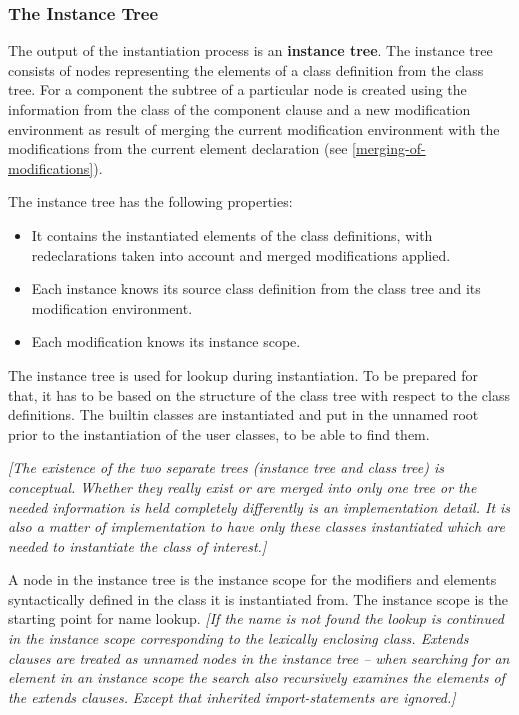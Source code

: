 \documentclass[10pt,a4paper]{report}
\def\doublelabel#1{\label{#1}}
\begin{document}
\subsubsection{The Instance Tree}\doublelabel{the-instance-tree}

The output of the instantiation process is an \textbf{instance tree}.
The instance tree consists of nodes representing the elements of a class
definition from the class tree. For a component the subtree of a
particular node is created using the information from the class of the
component clause and a new modification environment as result of merging
the current modification environment with the modifications from the
current element declaration (see \ref{merging-of-modifications}).

The instance tree has the following properties:

\begin{itemize}
\item
  It contains the instantiated elements of the class definitions, with
  redeclarations taken into account and merged modifications applied.
\end{itemize}

\begin{itemize}
\item
  Each instance knows its source class definition from the class tree
  and its modification environment.
\item
  Each modification knows its instance scope.
\end{itemize}

The instance tree is used for lookup during instantiation. To be
prepared for that, it has to be based on the structure of the class tree
with respect to the class definitions. The builtin classes are
instantiated and put in the unnamed root prior to the instantiation of
the user classes, to be able to find them.

\emph{{[}The existence of the two separate trees (instance tree and
class tree) is conceptual. Whether they really exist or are merged into
only one tree or the needed information is held completely differently
is an implementation detail. It is also a matter of implementation to
have only these classes instantiated which are needed to instantiate the
class of interest.{]} }

A node in the instance tree is the instance scope for the modifiers and
elements syntactically defined in the class it is instantiated from. The
instance scope is the starting point for name lookup. \emph{{[}If the
name is not found the lookup is continued in the instance scope
corresponding to the lexically enclosing class. Extends clauses are
treated as unnamed nodes in the instance tree -- when searching for an
element in an instance scope the search also recursively examines the
elements of the extends clauses.} \emph{Except that inherited
import-statements are ignored.{]}}
\end{document}

